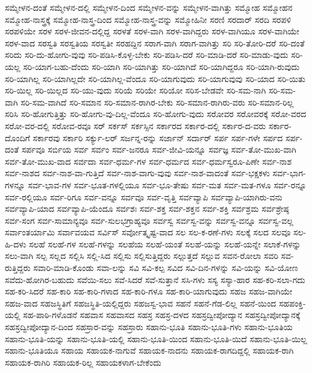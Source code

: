 {ಸಮ್ಮೇಳನ-ದಂತೆ
ಸಮ್ಮೇಳನ-ದಲ್ಲಿ
ಸಮ್ಮೇಳನ-ದಿಂದ
ಸಮ್ಮೇಳನ-ವನ್ನು
ಸಮ್ಮೇಳನ-ವಾಗಿತ್ತು
ಸಮ್ಮೋಹ
ಸಮ್ಮೋಹನ
ಸಮ್ಮೋಹ-ನಾಸ್ತ್ರಕ್ಕೆ
ಸಮ್ಮೋಹ-ನಾಸ್ತ್ರ-ದಿಂದ
ಸಮ್ಮೋಹ-ನಾಸ್ತ್ರ-ವನ್ನು
ಸಮ್ಮೋಹಿನೀ
ಸರಣಿ
ಸರದಾರ್
ಸರದಿ
ಸರಪಳಿ
ಸರಪಳಿಯೇ
ಸರಳ
ಸರಳ-ಜೀವನ-ದಲ್ಲಿದ್ದ
ಸರಳತೆ
ಸರಳ-ವಾಗಿ
ಸರಳ-ವಾಗಿದ್ದರು
ಸರಳ-ವಾಗಿಯೂ
ಸರಳ-ವಾಗಿಯೇ
ಸರಳ-ವಾದ
ಸರಸ್ವತಿ
ಸರಸ್ವತಿಯ
ಸರಸ್ವತೀ
ಸರಹದ್ದಿನ
ಸರಾಗ-ವಾಗಿ
ಸರಾಗ-ವಾಗಿತ್ತು
ಸರಿ
ಸರಿ-ತೋರಿ-ದರೆ
ಸರಿ-ದಂತೆ
ಸರಿದು
ಸರಿ-ದು-ಹೋಗು-ವುವು
ಸರಿ-ಪಡಿಸಿ-ಕೊಳ್ಳ-ಬೇಕು
ಸರಿ-ಪಡಿಸಿ-ದರೆ
ಸರಿ-ಮಾಡಿ-ದರೆ
ಸರಿ-ಮಾಡು-ವುದು
ಸರಿ-ಯಲ್ಲ
ಸರಿ-ಯಾಗ-ಬಹು-ದೆಂದು
ಸರಿ-ಯಾಗಿ
ಸರಿ-ಯಾಗಿತ್ತು
ಸರಿ-ಯಾಗಿದೆ
ಸರಿ-ಯಾಗಿದ್ದರೂ
ಸರಿ-ಯಾಗಿ-ರುವುದು
ಸರಿ-ಯಾಗಿಲ್ಲ
ಸರಿ-ಯಾಗಿಲ್ಲದೇ
ಸರಿ-ಯಾಗಿಲ್ಲ-ವೆಂದೂ
ಸರಿ-ಯಾಗುವುದು
ಸರಿ-ಯಾಗುವುವು
ಸರಿ-ಯಾದ
ಸರಿ-ಯಿತು
ಸರಿ-ಯಿಲ್ಲ
ಸರಿ-ಯಿಲ್ಲದ
ಸರಿ-ಯು-ವುದು
ಸರಿಯೆ
ಸರಿಯೇ
ಸರಿಯೋ
ಸರಿಸ-ಬೇಡವೇ
ಸರಿ-ಸಮ-ನಾಗಿ
ಸರಿ-ಸಮ-ವಾಗಿ
ಸರಿ-ಸಮ-ವಾಗಿದೆ
ಸರಿ-ಸಮಾನ
ಸರಿ-ಸಮಾನ-ರಾಗಿರ-ಬೇಕು
ಸರಿ-ಸಮಾನ-ರಾಗಿರು-ವರು
ಸರಿ-ಸಮಾನ-ರಿಲ್ಲ
ಸರಿಸಿ
ಸರಿ-ಹೋಗುತ್ತಿತ್ತು
ಸರಿ-ಹೋಗು-ವು-ದಿಲ್ಲ-ವೆಂದೂ
ಸರಿ-ಹೋಗು-ವುದು
ಸರೋವರ
ಸರೋವರಕ್ಕೆ
ಸರೋ-ವರದ
ಸರೋ-ವರ-ದಲ್ಲಿ
ಸರೋವ-ರವೂ
ಸರ್
ಸರ್ಕಸ್
ಸರ್ಕಸ್ಸಿನ
ಸರ್ಕಾರದ
ಸರ್ಕಾರ-ದಲ್ಲಿ
ಸರ್ಕಾರ-ದ-ವರು
ಸರ್ಕಾರ-ದೊಂದಿಗೆ
ಸರ್ಕಾರವು
ಸರ್ಕಾರಿ
ಸರ್ಕ್ಯು-ಲರ್
ಸರ್ಜನ್ನ-ರನ್ನು
ಸರ್ಜಾನ್
ಸರ್ದಾರ್
ಸರ್ಪ
ಸರ್ಪ-ಗಳೇ
ಸರ್ಪದ
ಸರ್ಪ-ದಂತೆ
ಸರ್ಪವೂ
ಸರ್ಬಿಯ
ಸರ್ವ
ಸರ್ವಂ
ಸರ್ವ-ಜನರೂ
ಸರ್ವ-ಜೀವಿ-ಯನ್ನೂ
ಸರ್ವಜ್ಞ
ಸರ್ವ-ತೋ-ಮುಖ-ವಾಗಿ
ಸರ್ವ-ತೋ-ಮುಖ-ವಾದ
ಸರ್ವದಾ
ಸರ್ವ-ಧರ್ಮ-ಗಳ
ಸರ್ವ-ಧರ್ಮದ
ಸರ್ವ-ಧರ್ಮಸ್ವರೂ-ಪಿಣೇ
ಸರ್ವ-ನಾಶ
ಸರ್ವ-ನಾಶದ
ಸರ್ವ-ನಾಶ-ವಾ-ಗುತ್ತಿದೆ
ಸರ್ವ-ನಾಶ-ವಾಗು-ವುವು
ಸರ್ವ-ನಾಶ-ವಾದಂತೆ
ಸರ್ವ-ಭಕ್ಷಕಳು
ಸರ್ವ-ಭಾಗ-ಗಳನ್ನೂ
ಸರ್ವ-ಭಾವ-ಗಳ
ಸರ್ವ-ಭೂತ-ಗಳಲ್ಲಿಯೂ
ಸರ್ವ-ಭೂ-ತೇಷು
ಸರ್ವ-ಮತ
ಸರ್ವ-ಮತ-ಗಳೂ
ಸರ್ವ-ರನ್ನೂ
ಸರ್ವ-ರಲ್ಲಿಯೂ
ಸರ್ವ-ರಿಗೂ
ಸರ್ವ-ವನ್ನೂ
ಸರ್ವವೂ
ಸರ್ವ-ವೃತ್ತಿ
ಸರ್ವವ್ಯಾಪಿ
ಸರ್ವವ್ಯಾಪಿ-ಯಾಗಿರು-ವನು
ಸರ್ವವ್ಯಾಪಿ-ಯಾದ
ಸರ್ವವ್ಯಾಪಿ-ಯೆಂದೂ
ಸರ್ವಶಃ
ಸರ್ವ-ಶಕ್ತ
ಸರ್ವ-ಶಕ್ತನ
ಸರ್ವ-ಶಕ್ತಿ
ಸರ್ವಶ್ರಮ
ಸರ್ವಶ್ರೇಷ್ಠ
ಸರ್ವ-ಸಂಗ
ಸರ್ವ-ಸಾಮಾನ್ಯವೂ
ಸರ್ವ-ಸುಲಭಗ್ರಾಹ್ಯವೂ
ಸರ್ವಸ್ವ
ಸರ್ವಸ್ವ-ವನ್ನು
ಸರ್ವಸ್ವ-ವನ್ನೂ
ಸರ್ವಸ್ವ-ವಲ್ಲ
ಸರ್ವಾಂತರ್ಯಾಮಿ
ಸರ್ವಾವಯವ
ಸರ್ವಿಸ್
ಸರ್ವೋತ್ಕೃಷ್ಟ-ವಾದ
ಸಲ
ಸಲ-ಕ-ರಣೆ-ಗಳು
ಸಲಕ್ಕೆ
ಸಲದ
ಸಲವೂ
ಸಲ-ಹಿ-ದಳು
ಸಲಹೆ
ಸಲಹೆ-ಗಳ
ಸಲಹೆ-ಗಳನ್ನು
ಸಲಹೆಯ
ಸಲಹೆ-ಯಂತೆ
ಸಲಹೆ-ಯನ್ನು
ಸಲಹೆ-ಯನ್ನೇ
ಸಲಾಕೆ-ಗಳನ್ನು
ಸಲು-ವಾಗಿ
ಸಲ್ಪ
ಸಲ್ಲದ
ಸಲ್ಲಿಸಿ
ಸಲ್ಲಿ-ಸಿದ
ಸಲ್ಲಿಸು
ಸಲ್ಲಿಸುತ್ತಿದ್ದರು
ಸಲ್ಲುತ್ತದೆ
ಸಲ್ಲುವ
ಸವನ-ರೋಲಾ
ಸವರಿ
ಸವ-ರುತ್ತಿದ್ದರು
ಸವಾರಿ-ಮಾಡಿ-ಕೊಂಡು
ಸವಾ-ಲನ್ನು
ಸವಿ
ಸವಿ-ಕಲ್ಪ
ಸವಿದ
ಸವಿ-ದಿನ-ಗಳನ್ನು
ಸವಿ-ಯನ್ನು
ಸವಿ-ಯೋಣ
ಸವೆದು-ಹೋಗಿರ-ಬಹುದು
ಸವೆಯಿ-ಸಲು
ಸವೆ-ಸಿದರೆ
ಸವೆ-ಸುತ್ತಾನೆ
ಸಸಿ-ಗಳು
ಸಸ್ಯ
ಸಸ್ಯಾ-ಹಾರ
ಸಹ-ಕರಿ-ಸಲಾ-ಗದು
ಸಹ-ಕರಿ-ಸಿದರೆ
ಸಹ-ಕಾರಿ
ಸಹ-ಕಾರಿ-ಗಳಾದ
ಸಹ-ಕಾರಿ-ಗಳೂ
ಸಹ-ಕಾರಿ-ಯಾಗುವುದು
ಸಹಜ
ಸಹಜ-ವಾಗಿಯೇ
ಸಹಜ-ವಾದ
ಸಹಜಸ್ಥಿತಿಗೆ
ಸಹಜಸ್ಥಿತಿ-ಯಲ್ಲಿದ್ದರು
ಸಹಜಸ್ವ-ಭಾವ
ಸಹನೆ
ಸಹನೆ-ಗೆಡ-ಲಿಲ್ಲ
ಸಹನೆ-ಯಿಂದ
ಸಹಪಂಕ್ತಿ-ಯಲ್ಲಿ
ಸಹ-ಪಾಠಿ-ಗಳೊಡನೆ
ಸಹವಾಸ
ಸಹವಾಸದ
ಸಹಸ್ರ
ಸಹಸ್ರ-ದಳದ
ಸಹಸ್ರದ್ವೀಪೋದ್ಯಾನ
ಸಹಸ್ರದ್ವೀಪೋದ್ಯಾನಕ್ಕೆ
ಸಹಸ್ರದ್ವೀಪೋದ್ಯಾನ-ದಿಂದ
ಸಹಸ್ರಾರ-ವನ್ನು
ಸಹಸ್ರಾರು
ಸಹಾನು-ಭೂತಿ
ಸಹಾನು-ಭೂತಿ-ಗಳು
ಸಹಾನು-ಭೂತಿಯ
ಸಹಾನು-ಭೂತಿ-ಯನ್ನು
ಸಹಾನು-ಭೂತಿ-ಯಲ್ಲಿ
ಸಹಾನು-ಭೂತಿ-ಯಿಂದ
ಸಹಾನು-ಭೂತಿ-ಯಿದೆ
ಸಹಾನು-ಭೂತಿ-ಯಿಲ್ಲ
ಸಹಾನು-ಭೂತಿಯೂ
ಸಹಾಯ
ಸಹಾಯಕ-ನಾಗುವೆ
ಸಹಾಯಕ-ನಾದನು
ಸಹಾಯಕ-ರಾಗದಿದ್ದಲ್ಲಿ
ಸಹಾಯಕ-ರಾಗಿ
ಸಹಾಯಕ-ರಾಗಿರಿ
ಸಹಾಯಕ-ರಿಲ್ಲ
ಸಹಾಯಕಳಾಗ-ಬೇಕೆಂದು
}
